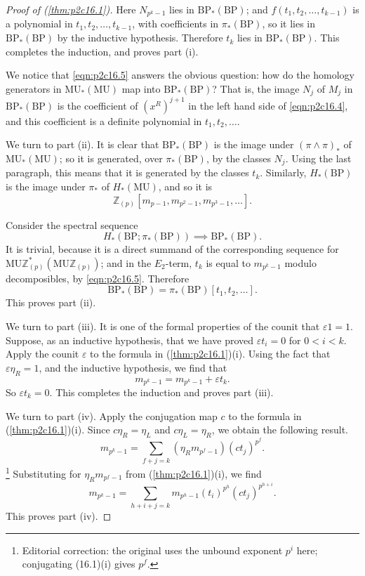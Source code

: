 \documentclass[../main]{subfiles}
\begin{document}
\begin{proof}[Proof of (\ref{thm:p2c16.1})]
Here $N_{p^k - 1}$ lies in $\mathrm{BP}_\ast(\mathrm {BP})$; and $f(t_1, t_2, \ldots, t_{k-1})$ is a polynomial in \newline$t_1, t_2, \ldots, t_{k - 1}$, with coefficients in $\pi_\ast(\mathrm{BP})$, so it lies in $\mathrm{BP}_\ast(\mathrm{BP})$ by the inductive hypothesis. Therefore $t_k$ lies in $\mathrm {BP}_\ast(\mathrm{BP})$. This completes the induction, and proves part (i).

We notice that \eqref{eqn:p2c16.5} answers the obvious question: how do the homology generators in $\mathrm{MU}_\ast(\mathrm{MU})$ map into $\mathrm{BP}_\ast(\mathrm{BP})$? That is, the image $N_j$ of $M_j$ in $\mathrm{BP}_\ast(\mathrm{BP})$ is the coefficient of $(x^R)^{j + 1}$ in the left hand side of \eqref{eqn:p2c16.4}, and this coefficient is a definite polynomial in $t_1, t_2, \ldots$. 

We turn to part (ii). It is clear that $\mathrm {BP}_\ast (\mathrm {BP})$ is the image under $(\pi \wedge \pi)_\ast$ of $\mathrm{MU}_\ast(\mathrm{MU})$; so it is generated, over $\pi_\ast(\mathrm{BP})$, by the classes $N_j$. Using the last paragraph, this means that it is generated by the classes $t_k$. Similarly, $H_\ast(\mathrm{BP})$ is the image under $\pi_\ast$ of $H_\ast(\mathrm{MU})$, and so it is \[\mathbb Z_{(p)}[m_{p - 1}, m_{p^2 - 1}, m_{p^3 - 1}, \ldots].\] 

Consider the spectral sequence \[H_\ast(\mathrm{BP}; \pi_\ast(\mathrm {BP})) \implies \mathrm{BP}_\ast(\mathrm{BP}).\] It is trivial, because it is a direct summand of the corresponding sequence for $\mathrm {MU} \mathbb Z_{(p)}^\ast(\mathrm {MU} \mathbb Z_{(p)})$; and in the $E_2$-term, $t_k$ is equal to $m_{p^k - 1}$ modulo decomposibles, by \eqref{eqn:p2c16.5}. Therefore \[\mathrm{BP}_\ast (\mathrm {BP}) = \pi_*(\mathrm {BP}) [t_1, t_2, \ldots].\] This proves part (ii).

We turn to part (iii). It is one of the formal properties of the counit that $\varepsilon 1 = 1$. Suppose, as an inductive hypothesis, that we have proved $\varepsilon t_i = 0$ for $0 < i < k$. Apply the counit $\varepsilon$ to the formula in (\ref{thm:p2c16.1})(i). Using the fact that $\varepsilon \eta_R = 1$, and the inductive hypothesis, we find that \[m_{p^k - 1} = m_{p^k - 1} + \varepsilon t_k.\] 
So $\varepsilon t_k=0$. This completes the induction and proves part (iii).

We turn to part (iv). Apply the conjugation map $c$ to the formula in (\ref{thm:p2c16.1})(i). Since $c \eta_R = \eta_L$ and $c \eta_L = \eta_R$, we obtain the following result. \[m_{p^k - 1} = \sum_{f + j = k} (\eta_R m_{p^f - 1}) (ct_j)^{p^f}.\]
\footnote{Editorial correction: the original uses the unbound exponent $p^i$ here; conjugating (16.1)(i) gives $p^f$.}
Substituting for $\eta_R m_{p^f - 1}$ from (\ref{thm:p2c16.1})(i), we find \[m_{p^k - 1} = \sum_{h + i + j = k} m_{p^h - 1} (t_i)^{p^h} (ct_j)^{p^{h + i}}.\] This proves part (iv).


\end{proof}
\end{document}

